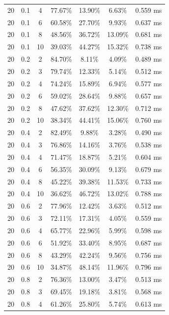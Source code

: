 \documentclass[11pt,a4paper]{article}
\begin{document}
\begin{longtable}{ccccccc}
        20 & 0.1 & 4 & 77.67\% & 13.90\% & 6.63\% & 0.559 ms \\
        20 & 0.1 & 6 & 60.58\% & 27.70\% & 9.93\% & 0.637 ms \\
        20 & 0.1 & 8 & 48.56\% & 36.72\% & 13.09\% & 0.681 ms \\
        20 & 0.1 & 10 & 39.03\% & 44.27\% & 15.32\% & 0.738 ms \\
        \midrule
        20 & 0.2 & 2 & 84.70\% & 8.11\% & 4.09\% & 0.489 ms \\
        20 & 0.2 & 3 & 79.74\% & 12.33\% & 5.14\% & 0.512 ms \\
        20 & 0.2 & 4 & 74.24\% & 15.89\% & 6.94\% & 0.577 ms \\
        20 & 0.2 & 6 & 59.02\% & 28.64\% & 9.88\% & 0.657 ms \\
        20 & 0.2 & 8 & 47.62\% & 37.62\% & 12.30\% & 0.712 ms \\
        20 & 0.2 & 10 & 38.34\% & 44.41\% & 15.06\% & 0.760 ms \\
        \midrule
        20 & 0.4 & 2 & 82.49\% & 9.88\% & 3.28\% & 0.490 ms \\
        20 & 0.4 & 3 & 76.86\% & 14.16\% & 3.76\% & 0.538 ms \\
        20 & 0.4 & 4 & 71.47\% & 18.87\% & 5.21\% & 0.604 ms \\
        20 & 0.4 & 6 & 56.35\% & 30.09\% & 9.13\% & 0.679 ms \\
        20 & 0.4 & 8 & 45.22\% & 39.38\% & 11.53\% & 0.733 ms \\
        20 & 0.4 & 10 & 36.62\% & 46.72\% & 13.02\% & 0.788 ms \\
        \midrule
        20 & 0.6 & 2 & 77.96\% & 12.42\% & 3.63\% & 0.512 ms \\
        20 & 0.6 & 3 & 72.11\% & 17.31\% & 4.05\% & 0.559 ms \\
        20 & 0.6 & 4 & 65.77\% & 22.96\% & 5.99\% & 0.598 ms \\
        20 & 0.6 & 6 & 51.92\% & 33.40\% & 8.95\% & 0.687 ms \\
        20 & 0.6 & 8 & 43.29\% & 42.24\% & 9.56\% & 0.756 ms \\
        20 & 0.6 & 10 & 34.87\% & 48.14\% & 11.96\% & 0.796 ms \\
        \midrule
        20 & 0.8 & 2 & 76.36\% & 13.00\% & 3.47\% & 0.513 ms \\
        20 & 0.8 & 3 & 69.45\% & 19.18\% & 3.81\% & 0.568 ms \\
        20 & 0.8 & 4 & 61.26\% & 25.80\% & 5.74\% & 0.613 ms \\

\end{longtable}
\end{document}
